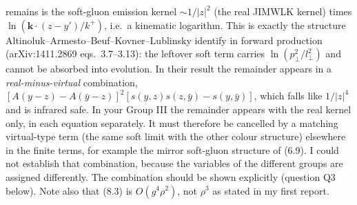 \documentclass[10pt]{article}
\begin{document}
remains is the soft-gluon emission kernel $\sim1/|z|^2$ (the real JIMWLK kernel) times $\ln(\mathbf k\cdot(z-y')/k^+)$, i.e.\ a kinematic logarithm. This is
exactly the structure Altinoluk--Armesto--Beuf--Kovner--Lublinsky identify in forward production (arXiv:1411.2869 eqs.~3.7--3.13): the leftover
soft term carries $\ln(p_\perp^2/l_\perp^2)$ and cannot be absorbed into evolution. In their result the remainder appears in a
\emph{real-minus-virtual} combination, $[A(y-z)-A(\bar y-z)]^2[s(y,z)s(z,\bar y)-s(y,\bar y)]$, which falls like $1/|z|^4$ and is infrared safe. In
your Group III the remainder appears with the real kernel only, in each equation separately. It must therefore be cancelled by a matching
virtual-type term (the same soft limit with the other colour structure) elsewhere in the finite terms, for example the mirror soft-gluon
structure of (6.9). I could not establish that combination, because the variables of the different groups are assigned differently. The
combination should be shown explicitly (question Q3 below). Note also that (8.3) is $O(g^4\rho^2)$, not $\rho^3$ as stated in my first report.

\end{document}
